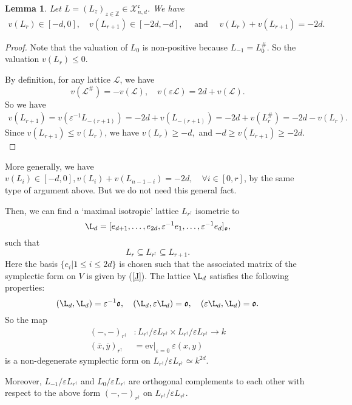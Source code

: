 \documentclass[12pt,reqno]{amsart}
\numberwithin{equation}{section}
\theoremstyle{definition}
\theoremstyle{plain}
\newtheorem{lem}[Def]{Lemma}
\begin{document}
\begin{lem}
Let  $L=(L_z)_{z\in {\mathbb{Z}}} \in {\mathcal X}^{\mathfrak{c}}_{n,d}$. We have
\begin{align*}
v(L_r) \in [-d, 0], \quad
v(L_{r + 1} ) \in [-2d, - d], \quad \text{ and } \quad
v(L_r) + v(L_{r + 1} ) = -2d.
\end{align*}
\end{lem}

\begin{proof}
Note that the valuation of $L_0$ is non-positive because $L_{-1}=L_0^{\#}$.
So the valuation  $v(L_r) \leq 0$.

By definition, for any lattice $\mathcal L$, we have
\[
v(\mathcal L^{\#}) = - v(\mathcal L), \quad
v({\varepsilon} \mathcal L) = 2d + v(\mathcal L).
\]
So we have
\begin{align*}
v(L_{r + 1})
 =  v( {\varepsilon}^{-1} L _{-(r + 1)}) 
 =  -2d + v(L_{-(r + 1)})
 = - 2d + v( L^{\#}_r)
 = - 2d - v(L_r).
\end{align*}
Since $v(L_{r + 1}) \leq v(L_r)$, we have
$
v(L_r) \geq  -d,
$
and
$
-d \geq v(L_{r + 1}) \geq -2d.
$
\end{proof}
More generally, we have
$
v(L_i) \in [-d, 0], v(L_i) + v(L_{n-1 -i}) = - 2d, \quad \forall i\in [0, r]$,
by the same type of argument above. But we do not need this general fact.  

Then, we can find a `maximal isotropic' lattice $L_{r^\dagger}$ isometric to
\[
\L_d =[e_{d+1},\ldots, e_{2d}, {\varepsilon}^{-1} e_1,\ldots, {\varepsilon}^{-1} e_d]_{\mathfrak o},
\]
such that
\[
L_r \subseteq L_{r^\dagger} \subseteq L_{r + 1}.
\]
Here the basis $\{ e_i| 1\leq i\leq 2d\}$ is chosen such that the associated matrix of the symplectic form on $V$ is given by (\ref{J}).
The lattice $\L_d$ satisfies the following properties: 
\[
(\L_d, \L_d) = {\varepsilon}^{-1} {\mathfrak o}, \quad
(\L_d, {\varepsilon} \L_d) = {\mathfrak o},  \quad
({\varepsilon} \L_d, \L_d)={\mathfrak o}.
\]
So the map
\begin{align*}
(-, - )_{r^\dagger} &: L_{r^\dagger}/ {\varepsilon} L_{r^\dagger} \times L_{r^\dagger} / {\varepsilon} L_{r^\dagger} \to k
 \\
(\bar x, \bar y)_{r^\dagger} &= \mathrm{ev}|_{{\varepsilon}=0} \ {\varepsilon} (x, y)  
\end{align*}
is a non-degenerate symplectic form on $ L_{r^\dagger}/ {\varepsilon} L_{r^\dagger}\simeq k^{2d}$.

Moreover, $L_{-1}/ {\varepsilon} L_{r^\dagger}$ and $L_0/ {\varepsilon} L_{r^\dagger}$ are orthogonal  complements  to each other
with respect to the above form $(-, -)_{r^\dagger}$ on $L_{r^\dagger}/ {\varepsilon} L_{r^\dagger}$.
\end{document}

